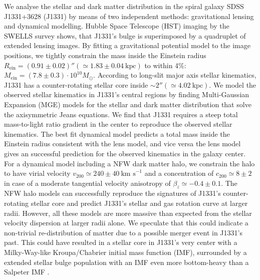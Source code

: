 We analyse the stellar and dark matter distribution in the spiral galaxy SDSS J1331+3628 (J1331) by means of two independent methods: gravitational lensing and dynamical modelling. Hubble Space Telescope (HST) imaging by the SWELLS survey shows, that J1331's bulge is superimposed by a quadruplet of extended lensing images. By fitting a gravitational potential model to the image positions, we tightly constrain the mass inside the Einstein radius $R_\text{ein}=(0.91\pm0.02)''(\simeq1.83\pm0.04~\text{kpc})$ to within 4\%: $M_\text{ein} = (7.8\pm0.3) \cdot 10^{10} M_\odot$. According to long-slit major axis stellar kinematics, J1331 has a counter-rotating stellar core inside $\sim 2''(\simeq4.02~\text{kpc})$. We model the observed stellar kinematics in J1331's central regions by finding Multi-Gaussian Expansion (MGE) models for the stellar and dark matter distribution that solve the axisymmetric Jeans equations. We find that J1331 requires a steep total mass-to-light ratio gradient in the center to reproduce the observed stellar kinematics. The best fit dynamical model predicts a total mass inside the Einstein radius consistent with the lens model, and vice versa the lens model gives an successful prediction for the observed kinematics in the galaxy center. For a dynamical model including a NFW dark matter halo,  we constrain the halo to have virial velocity $v_{200} \simeq 240 \pm 40~\text{km s}^{-1}$ and a concentration of $c_{200} \simeq 8 \pm 2$ in case of a moderate tangential velocity anisotropy of $\beta_z \simeq -0.4 \pm 0.1$. The NFW halo models can successfully reproduce the signatures of J1331's counter-rotating stellar core and predict J1331's stellar and gas rotation curve at larger radii. However, all these models are more massive than expected from the stellar velocity dispersion at larger radii alone. We speculate that this could indicate a non-trivial re-distribution of matter due to a possible merger event in J1331's past. This could have resulted in a stellar core in J1331's very center with a Milky-Way-like Kroupa/Chabrier initial mass function (IMF), surrounded by a extended stellar bulge population with an IMF even more bottom-heavy than a Salpeter IMF .